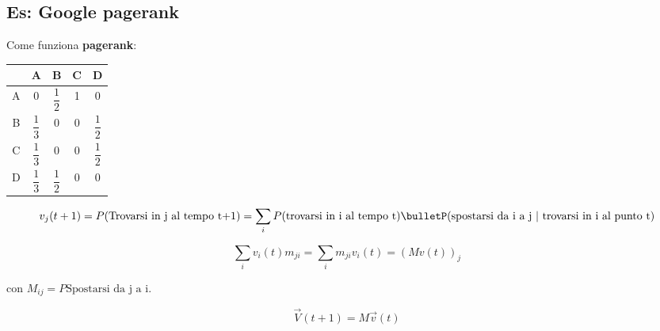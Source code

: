 \documentclass[\main/main.tex]{subfiles}
\begin{document}
\subsection{Es: Google pagerank}
Come funziona \textbf{pagerank}:

\begin{center}
\begin{tabular}{ |c|c|c|c|c| } 
 \hline
  & A & B & C & D \\ 
 \hline
 A & 0 & $\dfrac{1}{2}$ & 1 & 0 \\ 
 \hline
 B & $\dfrac{1}{3}$ & 0 & 0 & $\dfrac{1}{2}$ \\ 
 \hline
 C & $\dfrac{1}{3}$ & 0 & 0 & $\dfrac{1}{2}$ \\ 
 \hline
 D & $\dfrac{1}{3}$ & $\dfrac{1}{2}$ & 0 & 0 \\ 
 \hline
\end{tabular}
\end{center}

\[
	v_j(t+1) = P(\text{Trovarsi in j al tempo t+1}) = \sum_i P (\text{trovarsi in i al tempo t})\bulletP(\text{spostarsi da i a j | trovarsi in i al punto t})
\]

\[
	\sum_i v_i(t) m_{ji} = \sum_i m_{ji}v_i(t) = (Mv(t))_j
\]

con $M_{ij} = P \text{Spostarsi da j a i}$.

\[
	\vec{V}(t+1) = M\vec{v}(t)
\]
\end{document}
